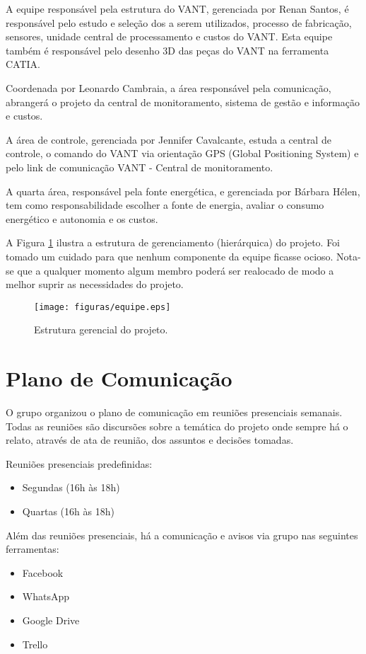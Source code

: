 A equipe responsável pela estrutura do VANT, gerenciada por Renan Santos, é responsável pelo estudo e seleção dos a serem utilizados, processo de fabricação, sensores, unidade central de processamento e custos do VANT. Esta equipe também é responsável pelo desenho 3D das peças do VANT na ferramenta CATIA.  
	
Coordenada por Leonardo Cambraia, a área responsável pela comunicação, abrangerá o projeto da central de monitoramento, sistema de gestão e informação e custos.
	
A área de controle, gerenciada por Jennifer Cavalcante, estuda a central de controle, o comando do VANT via orientação GPS (Global Positioning System) e pelo link de comunicação VANT - Central de monitoramento.
	
A quarta área, responsável pela fonte energética, e gerenciada por Bárbara Hélen, tem como responsabilidade escolher a fonte de energia, avaliar o consumo energético e autonomia e os custos.
	
A Figura \ref{fig:equipe} ilustra a estrutura de gerenciamento (hierárquica) do projeto. Foi tomado um cuidado para que nenhum componente da equipe ficasse ocioso. Nota-se que a qualquer momento algum membro poderá ser realocado de modo a melhor suprir as necessidades do projeto.

\begin{figure}[H]
	\centering
		\texttt{[image: figuras/equipe.eps]}
	\caption{Estrutura gerencial do projeto.}
	\label{fig:equipe}
\end{figure}

\section{Plano de Comunicação}
O grupo organizou o plano de comunicação em reuniões presenciais semanais. Todas as reuniões são discursões sobre a temática do projeto onde sempre há o relato, através de ata de reunião, dos assuntos e decisões tomadas. 

Reuniões presenciais predefinidas:
\begin{itemize}
	\item Segundas (16h às 18h)
	\item Quartas (16h às 18h)
\end{itemize}

Além das reuniões presenciais, há a comunicação e avisos via grupo nas seguintes ferramentas:
\begin{itemize}
	\item Facebook
	\item WhatsApp
	\item Google Drive
	\item Trello
\end{itemize}


